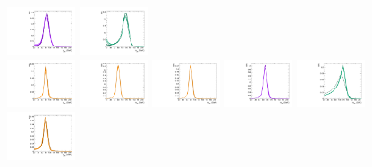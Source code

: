 \begin{figure}[htbp]
  \includegraphics[width=0.18\textwidth]{fig/analysis/templateSignalVsMX_fromDC_WprToWZ_MJJ_mu_LP_bb_DEtaHi.pdf}
  \includegraphics[width=0.18\textwidth]{fig/analysis/templateSignalVsMX_fromDC_WprToWH_MJJ_mu_LP_bb_DEtaHi.pdf}\\
  \includegraphics[width=0.18\textwidth]{fig/analysis/templateSignalVsMX_fromDC_GbuToWW_MJJ_mu_HP_nobb_DEtaHi.pdf}
  \includegraphics[width=0.18\textwidth]{fig/analysis/templateSignalVsMX_fromDC_RadToWW_MJJ_mu_HP_nobb_DEtaHi.pdf}
  \includegraphics[width=0.18\textwidth]{fig/analysis/templateSignalVsMX_fromDC_ZprToWW_MJJ_mu_HP_nobb_DEtaHi.pdf}
  \includegraphics[width=0.18\textwidth]{fig/analysis/templateSignalVsMX_fromDC_WprToWZ_MJJ_mu_HP_nobb_DEtaHi.pdf}
  \includegraphics[width=0.18\textwidth]{fig/analysis/templateSignalVsMX_fromDC_WprToWH_MJJ_mu_HP_nobb_DEtaHi.pdf}\\
  \includegraphics[width=0.18\textwidth]{fig/analysis/templateSignalVsMX_fromDC_GbuToWW_MJJ_mu_LP_nobb_DEtaHi.pdf}

\end{figure}
